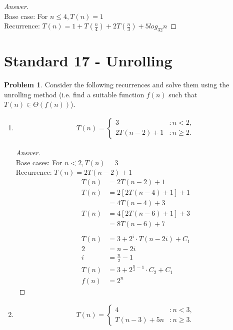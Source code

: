 \documentclass[11pt]{article}
\theoremstyle{definition}
\theoremstyle{definition}
\newtheorem{required}{Problem}
\theoremstyle{definition}
\begin{document}
\begin{proof}[Answer] $ $\\
Base case:  For $n \leq 4, T(n) = 1$ \\
Recurrence: $T(n) = 1 + T(\frac{n}{4}) + 2T(\frac{n}{3}) + 5log_32n$
\end{proof}

\newpage

\section{Standard 17 - Unrolling}

\begin{required} \label{Unrolling1}
Consider the following recurrences and solve them using the unrolling method (i.e. find a suitable function $f(n)$ such that $T(n) \in \Theta(f(n))$). 
\begin{enumerate} [label=(\alph*)]
    \item 
\begin{align*}
T(n) = \begin{cases}
3 & : n < 2, \\
2T(n - 2) + 1 & : n \geq 2.
\end{cases}
\end{align*}

\begin{proof}[Answer] $ $ \\
Base cases: For $n < 2, T(n) = 3$ \\
Recurrence: $T(n) =2T(n-2) + 1$
\begin{align*}
    T(n) &= 2T(n-2) + 1 \\
    T(n) &= 2[2T(n-4)+1] +1 \\
    &= 4T(n-4) + 3 \\
    T(n) &=  4[2T(n-6)+1] + 3 \\
    &= 8T(n-6) + 7 \\ \\
    T(n) &= 3 + 2^i \cdot T(n-2i)+ C_1 \\
    2 &=  n-2i \\
    i &= \frac{n}{2} -1 \\ 
    T(n) &= 3 + 2^{\frac{n}{2} -1} \cdot C_2 + C_1 \\
    f(n) &= 2^n 
\end{align*}
\end{proof}

\newpage
\item
\begin{align*}
T(n) = \begin{cases}
4 & : n < 3, \\
T(n-3) + 5n & : n \geq 3.
\end{cases}
\end{align*}


\end{enumerate}
\end{required}
\end{document}
